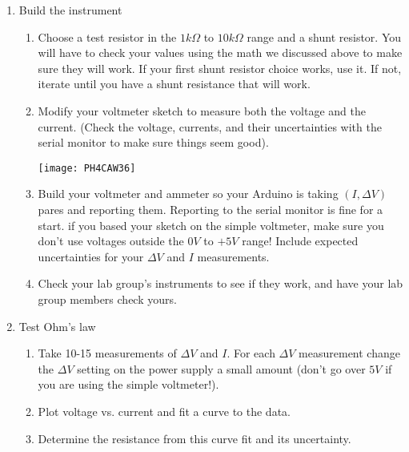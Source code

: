 \activity
{

\begin{enumerate}
\item Build the instrument

\begin{enumerate}
\item Choose a test resistor in the $1\unit{k%
\Omega%
}$ to $10\unit{k%
\Omega%
}$ range and a shunt resistor. You will have to check your values using the
math we discussed above to make sure they will work. If your first shunt
resistor choice works, use it. If not, iterate until you have a shunt
resistance that will work.

\item Modify your voltmeter sketch to measure both the voltage and the
current. (Check the voltage, currents, and their uncertainties with the
serial monitor to make sure things seem good).

\begin{center}
\texttt{[image: PH4CAW36]}
\end{center}
\item Build your voltmeter and ammeter so your Arduino is taking $\left(
I,\Delta V\right) $ pares and reporting them. Reporting to the serial
monitor is fine for a start. 
if you based your sketch on the
simple voltmeter, make sure you don't use voltages outside the $0\unit{V}$
to $+5\unit{V}$ range! Include expected uncertainties for your $\Delta V$
and $I$ measurements.

\item Check your lab group's instruments to see if they work, and have your
lab group members check yours.
\end{enumerate}

\item Test Ohm's law

\begin{enumerate}
\item Take 10-15 measurements of $\Delta V$ and $I.$ For each $\Delta V$
measurement change the $\Delta V$ setting on the power supply a small amount
(don't go over $5\unit{V}$ if you are using the simple voltmeter!).

\item Plot voltage vs. current and fit a curve to the data.

\item Determine the resistance from this curve fit and its uncertainty.


\end{enumerate}
\end{enumerate}}
